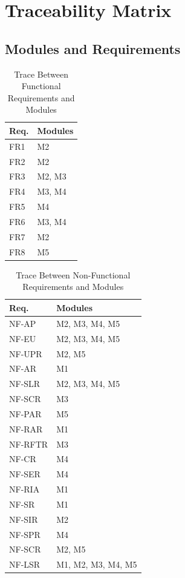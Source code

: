 \documentclass[12pt, titlepage]{article}
\begin{document}
\section{Traceability Matrix} \label{SecTM}
\subsection{Modules and Requirements}

\begin{table}[H]
\centering
\begin{tabular}{p{} p{}}
\toprule
\textbf{Req.} & \textbf{Modules}\\
\midrule
FR1 & M2\\
FR2 & M2\\
FR3 & M2, M3\\
FR4 & M3, M4\\
FR5 & M4\\
FR6 & M3, M4\\
FR7 & M2\\
FR8 & M5\\
\bottomrule
\end{tabular}
\caption{Trace Between Functional Requirements and Modules}
\label{TblRT}
\end{table}

\begin{table}[H]
\centering
\begin{tabular}{p{} p{}}
\toprule
\textbf{Req.} & \textbf{Modules}\\
\midrule
NF-AP & M2, M3, M4, M5\\
NF-EU & M2, M3, M4, M5\\
NF-UPR & M2, M5\\
NF-AR & M1\\
NF-SLR & M2, M3, M4, M5\\
NF-SCR & M3\\
NF-PAR & M5\\
NF-RAR & M1\\
NF-RFTR & M3\\
NF-CR & M4\\
NF-SER & M4\\
NF-RIA & M1\\
NF-SR & M1\\
NF-SIR & M2\\
NF-SPR & M4\\
NF-SCR & M2, M5\\
NF-LSR & M1, M2, M3, M4, M5\\

\bottomrule
\end{tabular}
\caption{Trace Between Non-Functional Requirements and Modules}
\label{TblRT}
\end{table}
\end{document}
